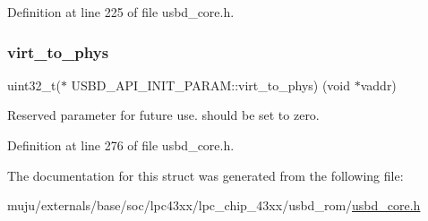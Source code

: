 Definition at line 225 of file usbd\+\_\+core.\+h.

\mbox{\label{struct_u_s_b_d___a_p_i___i_n_i_t___p_a_r_a_m_a3f58316f83bb0523073216d80ae35e8d}} 
\subsubsection{\texorpdfstring{virt\+\_\+to\+\_\+phys}{virt\_to\_phys}}
{\footnotesize\ttfamily uint32\+\_\+t($\ast$  U\+S\+B\+D\+\_\+\+A\+P\+I\+\_\+\+I\+N\+I\+T\+\_\+\+P\+A\+R\+A\+M\+::virt\+\_\+to\+\_\+phys) (void $\ast$vaddr)}

Reserved parameter for future use. should be set to zero. 

Definition at line 276 of file usbd\+\_\+core.\+h.



The documentation for this struct was generated from the following file\+:\begin{DoxyCompactItemize}
\item 
muju/externals/base/soc/lpc43xx/lpc\+\_\+chip\+\_\+43xx/usbd\+\_\+rom/\hyperlink{usbd__core_8h}{usbd\+\_\+core.\+h}\end{DoxyCompactItemize}

